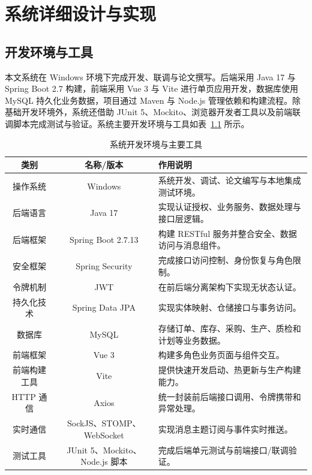 \chapter{系统详细设计与实现}

\section{开发环境与工具}

本文系统在 Windows 环境下完成开发、联调与论文撰写。后端采用 Java 17 与 Spring Boot 2.7 构建，前端采用 Vue 3 与 Vite 进行单页应用开发，数据库使用 MySQL 持久化业务数据，项目通过 Maven 与 Node.js 管理依赖和构建流程。除基础开发环境外，系统还借助 JUnit 5、Mockito、浏览器开发者工具以及前端联调脚本完成测试与验证。系统主要开发环境与工具如表~\ref{tab:dev-env-real} 所示。

\begin{table}[htbp]
\centering
\footnotesize
\caption{系统开发环境与主要工具}
\label{tab:dev-env-real}
\begin{tabular}{|c|c|p{6.2cm}|}
\hline
类别 & 名称/版本 & 作用说明 \\\hline
操作系统 & Windows & 系统开发、调试、论文编写与本地集成测试环境。 \\\hline
后端语言 & Java 17 & 实现认证授权、业务服务、数据处理与接口层逻辑。 \\\hline
后端框架 & Spring Boot 2.7.13 & 构建 RESTful 服务并整合安全、数据访问与消息组件。 \\\hline
安全框架 & Spring Security & 完成接口访问控制、身份恢复与角色限制。 \\\hline
令牌机制 & JWT & 在前后端分离架构下实现无状态认证。 \\\hline
持久化技术 & Spring Data JPA & 实现实体映射、仓储接口与事务访问。 \\\hline
数据库 & MySQL & 存储订单、库存、采购、生产、质检和计划等业务数据。 \\\hline
前端框架 & Vue 3 & 构建多角色业务页面与组件交互。 \\\hline
前端构建工具 & Vite & 提供快速开发启动、热更新与生产构建能力。 \\\hline
HTTP 通信 & Axios & 统一封装前后端接口调用、令牌携带和异常处理。 \\\hline
实时通信 & SockJS、STOMP、WebSocket & 实现消息主题订阅与事件实时推送。 \\\hline
测试工具 & JUnit 5、Mockito、Node.js 脚本 & 完成后端单元测试与前端接口/联调验证。 \\\hline
\end{tabular}
\end{table}

